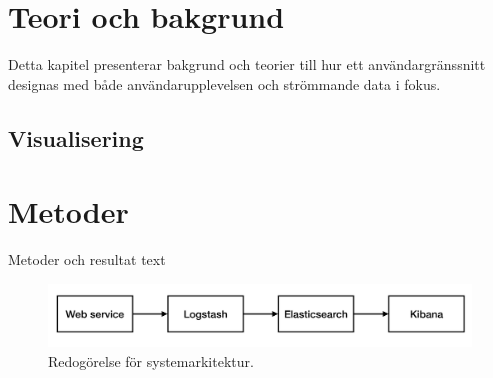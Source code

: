 \documentclass{kththesis}
\begin{document}
\chapter{Teori och bakgrund}

Detta kapitel presenterar bakgrund och teorier till hur ett användargränssnitt designas med både användarupplevelsen och strömmande data i fokus. 

\section{Visualisering} 
\subsection{} 


\chapter{Metoder}
Metoder och resultat text
\blindtext


\begin{figure}[h]
\centering
\includegraphics[width=1\textwidth]{Systemarkitektur}
\caption{Redogörelse för systemarkitektur.}
\end{figure}

\captionsetup[table]{name=Tabel}
\end{document}
